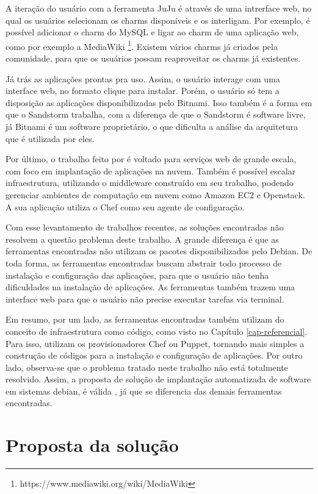 A iteração do usuário com a ferramenta JuJu é através de uma intrerface web, 
no qual os usuários selecionam os charms disponíveis e os interligam. 
Por exemplo, é possível adicionar o charm do MySQL e ligar ao charm de uma aplicação
web, como por exemplo a MediaWiki \footnote{https://www.mediawiki.org/wiki/MediaWiki}. Existem
vários charms já criados pela comunidade, para que os usuários possam reaproveitar
os charms já existentes.
 
Já  trás as aplicações prontas pra uso. Assim, o usuário interage com 
uma interface web, no formato clique para instalar. Porém,
o usuário só tem a disposição as aplicações disponibilizadas pelo Bitnami. Isso
também é a forma em que o Sandstorm trabalha, com a diferença de que o Sandstorm é
software livre, já Bitnami é um software proprietário, o que dificulta a análise da arquitetura
que é utilizada por eles. 

Por último, o trabalho feito por  é voltado
para serviços web de grande escala, com foco em implantação de aplicações na
nuvem. Também é possível escalar infraestrutura, utilizando o middleware construído 
em seu trabalho, podendo gerenciar ambientes de computação em nuvem como Amazon EC2 e 
Openstack. A sua aplicação utiliza o Chef como seu agente de configuração.

Com esse levantamento de trabalhos recentes, as soluções encontradas não resolvem a questão problema deste trabalho. A grande diferença é que as ferramentas encontradas não utilizam os pacotes
disponibilizados pelo Debian. De toda forma, as ferramentas encontradas buscam
abstrair todo processo de instalação e configuração das aplicações, para que o
usuário não tenha dificuldades na instalação de aplicações. As ferramentas também
trazem uma interface web para que o usuário não precise executar tarefas via terminal.

Em resumo, por um lado, as ferramentas encontradas também utilizam do conceito de
infraestrutura como código, como visto no Capítulo \ref{cap-referencial}. Para
isso, utilizam os provisionadores Chef ou Puppet, tornando mais simples a
construção de códigos para a instalação e configuração de aplicações. Por outro lado, 
observa-se que o problema tratado neste trabalho não está totalmente resolvido. Assim, 
a proposta de solução de implantação automatizada de software em sistemas debian, é válida
, já que se diferencia das demais ferramentas encontradas.

\section{Proposta da solução}
\label{section:construcao}

